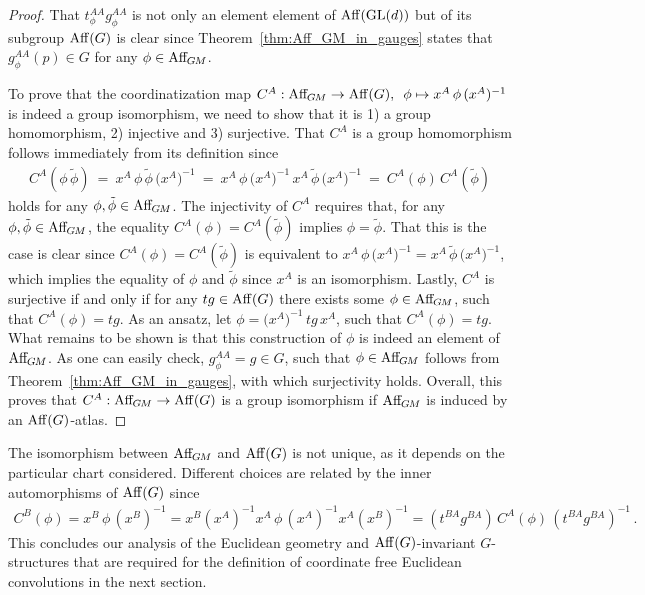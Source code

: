 \begin{proof}
    That $t_\phi^{AA} g_\phi^{AA}$ is not only an element element of $\operatorname{Aff}(\operatorname{GL}(d))$ but of its subgroup $\operatorname{Aff}(G)$ is clear since Theorem~\ref{thm:Aff_GM_in_gauges} states that $g_\phi^{AA}(p) \in G$ for any $\phi \in \operatorname{Aff}_{\mkern-2muG\mkern-1.4muM}$.

    To prove that the coordinatization map $C^A: \operatorname{Aff}_{\mkern-2muG\mkern-1.4muM} \to \operatorname{Aff}(G),\,\ \phi \mapsto x^A \,\phi\, (x^A)^{-1}$ is indeed a group isomorphism, we need to show that it is
    1) a group homomorphism,
    2) injective and
    3) surjective.
    That $C^A$ is a group homomorphism follows immediately from its definition since
    \begin{align}
        C^A(\phi\, \tilde{\phi})
        \ =\ x^A\, \phi\, \tilde{\phi}\, \big(x^A\big)^{-1}
        \ =\ x^A\, \phi\, \big(x^A\big)^{-1}\, x^A\, \tilde{\phi}\, \big(x^A\big)^{-1}
        \ =\ C^A(\phi)\, C^A(\tilde{\phi})
    \end{align}
    holds for any $\phi,\tilde{\phi} \in \operatorname{Aff}_{\mkern-2muG\mkern-1.4muM}$.
    The injectivity of $C^A$ requires that, for any $\phi,\tilde{\phi} \in \operatorname{Aff}_{\mkern-2muG\mkern-1.4muM}$, the equality $C^A(\phi) = C^A(\tilde{\phi})$ implies $\phi = \tilde{\phi}$.
    That this is the case is clear since $C^A(\phi) = C^A(\tilde{\phi})$ is equivalent to 
    $x^A\, \phi\, \big(x^A\big)^{-1} = x^A\, \tilde{\phi}\, \big(x^A\big)^{-1}$, which implies the equality of $\phi$ and $\tilde{\phi}$ since $x^A$ is an isomorphism.
    Lastly, $C^A$ is surjective if and only if for any $tg \in \operatorname{Aff}(G)$ there exists some $\phi \in \operatorname{Aff}_{\mkern-2muG\mkern-1.4muM}$, such that $C^A(\phi) = tg$.
    As an ansatz, let $\phi = \big(x^A\big)^{-1} \,tg\, x^A$, such that $C^A(\phi) = tg$.
    What remains to be shown is that this construction of $\phi$ is indeed an element of $\operatorname{Aff}_{\mkern-2muG\mkern-1.4muM}$.
    As one can easily check, $g_\phi^{AA} = g \in G$, such that $\phi \in \operatorname{Aff}_{\mkern-2muG\mkern-1.4muM}$ follows from Theorem~\ref{thm:Aff_GM_in_gauges}, with which surjectivity holds.
    Overall, this proves that $C^A: \operatorname{Aff}_{\mkern-2muG\mkern-1.4muM} \to \operatorname{Aff}(G)$ is a group isomorphism if $\operatorname{Aff}_{\mkern-2muG\mkern-1.4muM}$ is induced by an $\operatorname{Aff}(G)$-atlas.
\end{proof}

The isomorphism between $\operatorname{Aff}_{\mkern-2muG\mkern-1.4muM}$ and $\operatorname{Aff}(G)$ is not unique, as it depends on the particular chart considered.
Different choices are related by the inner automorphisms of $\operatorname{Aff}(G)$ since
\begin{align}
    C^B(\phi) 
    = x^B \,\phi\, (x^B)^{-1}
    = x^B (x^A)^{-1} x^A \,\phi\, (x^A)^{-1} x^A (x^B)^{-1}
    = (t^{BA} g^{BA}) \,C^A(\phi)\, (t^{BA} g^{BA})^{-1}
    \,.
\end{align}
This concludes our analysis of the Euclidean geometry and $\operatorname{Aff}(G)$-invariant $G$-structures that are required for the definition of coordinate free Euclidean convolutions in the next section.
